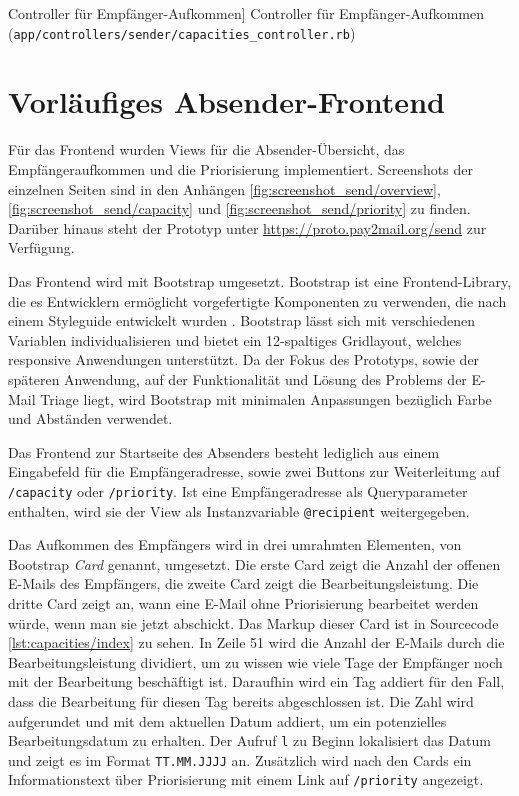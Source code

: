 \begin{listing}[!ht]
\inputminted[linenos]{ruby}{Listings/Prototype/capacities_controller.rb}

\caption
    [Controller für Empfänger-Aufkommen]
    {Controller für Empfänger-Aufkommen (\texttt{app/controllers/sender/capacities\_controller.rb})}

\label{lst:capacities_controller}
\end{listing}

\section{Vorläufiges Absender-Frontend}
Für das Frontend wurden Views für die Absender-Übersicht, das Empfängeraufkommen und die Priorisierung implementiert. Screenshots der einzelnen Seiten sind in den Anhängen \ref{fig:screenshot_send/overview}, \ref{fig:screenshot_send/capacity} und \ref{fig:screenshot_send/priority} zu finden. Darüber hinaus steht der Prototyp unter \url{https://proto.pay2mail.org/send} zur Verfügung.

Das Frontend wird mit Bootstrap umgesetzt. Bootstrap ist eine Frontend-Library, die es Entwicklern ermöglicht vorgefertigte Komponenten zu verwenden, die nach einem Styleguide entwickelt wurden \citep{Twitter2022}. Bootstrap lässt sich mit verschiedenen Variablen individualisieren und bietet ein 12-spaltiges Gridlayout, welches responsive Anwendungen unterstützt. Da der Fokus des Prototyps, sowie der späteren Anwendung, auf der Funktionalität und Lösung des Problems der E-Mail Triage liegt, wird Bootstrap mit minimalen Anpassungen bezüglich Farbe und Abständen verwendet.

Das Frontend zur Startseite des Absenders besteht lediglich aus einem Eingabefeld für die Empfängeradresse, sowie zwei Buttons zur Weiterleitung auf \texttt{/capacity} oder \texttt{/priority}. Ist eine Empfängeradresse als Queryparameter enthalten, wird sie der View als Instanzvariable \texttt{@recipient} weitergegeben.

Das Aufkommen des Empfängers wird in drei umrahmten Elementen, von Bootstrap \textit{Card} genannt, umgesetzt. Die erste Card zeigt die Anzahl der offenen E-Mails des Empfängers, die zweite Card zeigt die Bearbeitungsleistung. Die dritte Card zeigt an, wann eine E-Mail ohne Priorisierung bearbeitet werden würde, wenn man sie jetzt abschickt. Das Markup dieser Card ist in Sourcecode \ref{lst:capacities/index} zu sehen. In Zeile 51 wird die Anzahl der E-Mails durch die Bearbeitungsleistung dividiert, um zu wissen wie viele Tage der Empfänger noch mit der Bearbeitung beschäftigt ist. Daraufhin wird ein Tag addiert für den Fall, dass die Bearbeitung für diesen Tag bereits abgeschlossen ist. Die Zahl wird aufgerundet und mit dem aktuellen Datum addiert, um ein potenzielles Bearbeitungsdatum zu erhalten. Der Aufruf \texttt{l} zu Beginn lokalisiert das Datum und zeigt es im Format \texttt{TT.MM.JJJJ} an. Zusätzlich wird nach den Cards ein Informationstext über Priorisierung mit einem Link auf \texttt{/priority} angezeigt.

